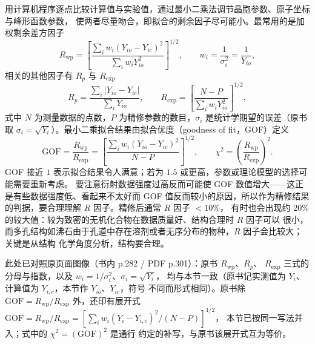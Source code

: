 \begin{principle}
用计算机程序逐点比较计算值与实验值，通过最小二乘法调节晶胞参数、原子坐标与峰形函数参数，
使两者尽量吻合，即拟合的剩余因子尽可能小。最常用的是加权剩余差方因子
\begin{equation}
R_{\mathrm{wp}}=\left[\frac{\sum_{i}w_{i}\left(Y_{io}-Y_{ic}\right)^{2}}
{\sum_{i}w_{i}Y_{io}^{2}}\right]^{1/2},
\qquad
w_{i}=\frac{1}{\sigma_{i}^{2}}=\frac{1}{Y_{io}},
\label{eq:ch04c-rwp}
\end{equation}
相关的其他因子有 $R_{p}$ 与 $R_{\mathrm{exp}}$
\begin{equation}
R_{p}=\frac{\sum_{i}\left|Y_{io}-Y_{ic}\right|}{\sum_{i}Y_{io}},
\qquad
R_{\mathrm{exp}}=\left[\frac{N-P}{\sum_{i}w_{i}Y_{io}^{2}}\right]^{1/2},
\label{eq:ch04c-rpexp}
\end{equation}
式中 $N$ 为测量数据的点数，$P$ 为精修参数的数目，$\sigma_{i}$ 是统计学期望的误差（原书取
$\sigma_{i}=\sqrt{Y_{i}}$）。最小二乘拟合结果由拟合优度（goodness of fit，GOF）定义
\begin{equation}
\mathrm{GOF}=\frac{R_{\mathrm{wp}}}{R_{\mathrm{exp}}}
=\left[\frac{\sum_{i}w_{i}\left(Y_{io}-Y_{ic}\right)^{2}}{N-P}\right]^{1/2},
\qquad
\chi^{2}=\left(\frac{R_{\mathrm{wp}}}{R_{\mathrm{exp}}}\right)^{2}.
\label{eq:ch04c-gof}
\end{equation}
GOF 接近 $1$ 表示拟合结果令人满意；若为 $1.5$ 或更高，参数或理论模型的选择可能需要重新考虑。
要注意衍射数据强度过高反而可能使 GOF 数值增大——这正是有些数据强度低、看起来不太好而 GOF
值反而较小的原因，所以作为精修结果的判据，要合理理解 $R$ 因子。精修后通常 $R$ 因子 $<10\%$，
有时也会出现约 $20\%$ 的较大值：较为致密的无机化合物在数据质量好、结构合理时 $R$ 因子可以
很小，而多孔结构如沸石由于孔道中存在溶剂或者无序分布的物种，$R$ 因子会比较大；关键是从结构
化学角度分析，结构要合理。

此处已对照原页面图像（书内 p.282 / PDF p.301）：原书 $R_{\mathrm{wp}}$、$R_{p}$、
$R_{\mathrm{exp}}$ 三式的分母与指数，以及 $w_{i}=1/\sigma_{i}^{2}$、$\sigma_{i}=\sqrt{Y_{i}}$，
均与本节一致（原书记实测值为 $Y_{i}$、计算值为 $Y_{i,c}$，本节作 $Y_{io}$、$Y_{ic}$，符号
不同而形式相同）。原书除 $\mathrm{GOF}=R_{\mathrm{wp}}/R_{\mathrm{exp}}$ 外，还印有展开式
$\mathrm{GOF}=R_{\mathrm{wp}}/R_{\mathrm{exp}}=[\sum_{i}w_{i}(Y_{i}-Y_{i,c})^{2}/(N-P)]^{1/2}$，
本节已按同一写法并入；式中的 $\chi^{2}=(\mathrm{GOF})^{2}$ 是通行
约定的补写，与原书该展开式互为等价。
\end{principle}


